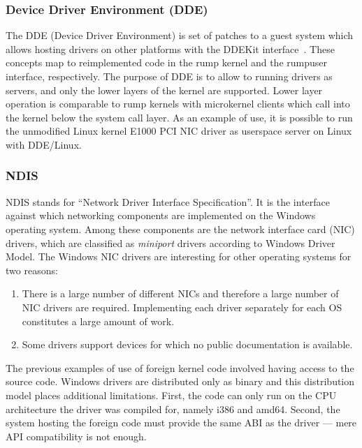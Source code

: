 \subsubsection*{Device Driver Environment (DDE)}

The DDE (Device Driver Environment) is set of patches to a guest
system which allows hosting drivers on other platforms with the
DDEKit interface~\cite{ddekitwiki}.  These concepts map to
reimplemented code in the rump kernel and the rumpuser interface,
respectively.  The purpose of DDE is to allow to running drivers as
servers, and only the lower layers of the kernel are supported.
Lower layer operation is comparable to rump kernels with microkernel
clients which call into the kernel below the system call layer.  As
an example of use, it is possible to run the unmodified Linux kernel
E1000 PCI NIC driver as userspace server on
Linux~\cite{weisbach:ddekit} with DDE/Linux.

\subsubsection*{NDIS}

NDIS stands for ``Network Driver Interface Specification''.  It is
the interface against which networking components are implemented on
the Windows operating system.  Among these components are the
network interface card (NIC) drivers, which are classified as
\textit{miniport} drivers according to Windows Driver Model.  The
Windows NIC drivers are interesting for other operating systems for
two reasons:

\begin{enumerate}
\item	There is a large number of different NICs and therefore a
	large number of NIC drivers are required.  Implementing each
	driver separately for each OS constitutes a large amount of
	work.

\item	Some drivers support devices for which no public
	documentation is available.
\end{enumerate}

The previous examples of use of foreign kernel code involved having
access to the source code.  Windows drivers are distributed only as
binary and this distribution model places additional limitations.  First, the code can
only run on the CPU architecture the driver was compiled for, namely i386 and amd64.
Second, the system hosting the foreign code must provide the same
ABI as the driver --- mere API compatibility is not enough.

